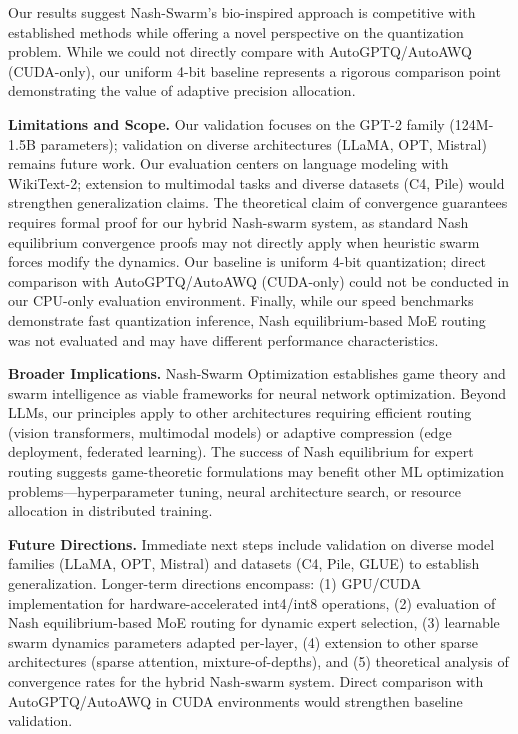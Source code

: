 \documentclass[11pt]{article}
\begin{document}
Our results suggest Nash-Swarm's bio-inspired approach is competitive with established methods while offering a novel perspective on the quantization problem. While we could not directly compare with AutoGPTQ/AutoAWQ (CUDA-only), our uniform 4-bit baseline represents a rigorous comparison point demonstrating the value of adaptive precision allocation.

\textbf{Limitations and Scope.} Our validation focuses on the GPT-2 family (124M-1.5B parameters); validation on diverse architectures (LLaMA, OPT, Mistral) remains future work. Our evaluation centers on language modeling with WikiText-2; extension to multimodal tasks and diverse datasets (C4, Pile) would strengthen generalization claims. The theoretical claim of convergence guarantees requires formal proof for our hybrid Nash-swarm system, as standard Nash equilibrium convergence proofs may not directly apply when heuristic swarm forces modify the dynamics. Our baseline is uniform 4-bit quantization; direct comparison with AutoGPTQ/AutoAWQ (CUDA-only) could not be conducted in our CPU-only evaluation environment. Finally, while our speed benchmarks demonstrate fast quantization inference, Nash equilibrium-based MoE routing was not evaluated and may have different performance characteristics.

\textbf{Broader Implications.} Nash-Swarm Optimization establishes game theory and swarm intelligence as viable frameworks for neural network optimization. Beyond LLMs, our principles apply to other architectures requiring efficient routing (vision transformers, multimodal models) or adaptive compression (edge deployment, federated learning). The success of Nash equilibrium for expert routing suggests game-theoretic formulations may benefit other ML optimization problems---hyperparameter tuning, neural architecture search, or resource allocation in distributed training.

\textbf{Future Directions.} Immediate next steps include validation on diverse model families (LLaMA, OPT, Mistral) and datasets (C4, Pile, GLUE) to establish generalization. Longer-term directions encompass: (1) GPU/CUDA implementation for hardware-accelerated int4/int8 operations, (2) evaluation of Nash equilibrium-based MoE routing for dynamic expert selection, (3) learnable swarm dynamics parameters adapted per-layer, (4) extension to other sparse architectures (sparse attention, mixture-of-depths), and (5) theoretical analysis of convergence rates for the hybrid Nash-swarm system. Direct comparison with AutoGPTQ/AutoAWQ in CUDA environments would strengthen baseline validation.
\end{document}
